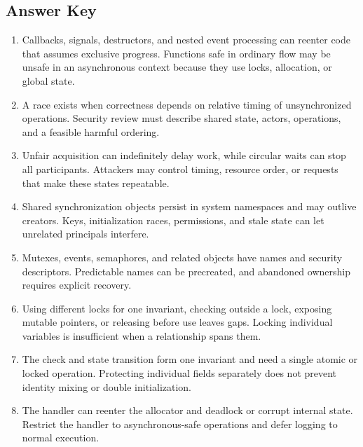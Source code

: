 \documentclass[11pt,letterpaper]{article}
\begin{document}
\subsection*{Answer Key}
\begin{enumerate}
\item Callbacks, signals, destructors, and nested event processing can reenter code that assumes exclusive progress. Functions safe in ordinary flow may be unsafe in an asynchronous context because they use locks, allocation, or global state.
\item A race exists when correctness depends on relative timing of unsynchronized operations. Security review must describe shared state, actors, operations, and a feasible harmful ordering.
\item Unfair acquisition can indefinitely delay work, while circular waits can stop all participants. Attackers may control timing, resource order, or requests that make these states repeatable.
\item Shared synchronization objects persist in system namespaces and may outlive creators. Keys, initialization races, permissions, and stale state can let unrelated principals interfere.
\item Mutexes, events, semaphores, and related objects have names and security descriptors. Predictable names can be precreated, and abandoned ownership requires explicit recovery.
\item Using different locks for one invariant, checking outside a lock, exposing mutable pointers, or releasing before use leaves gaps. Locking individual variables is insufficient when a relationship spans them.
\item The check and state transition form one invariant and need a single atomic or locked operation. Protecting individual fields separately does not prevent identity mixing or double initialization.
\item The handler can reenter the allocator and deadlock or corrupt internal state. Restrict the handler to asynchronous-safe operations and defer logging to normal execution.
\end{enumerate}
\end{document}

